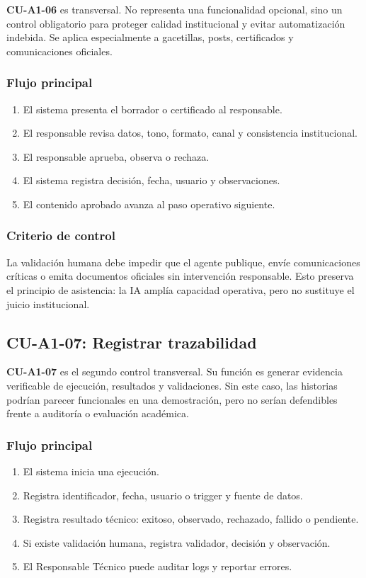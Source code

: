 \documentclass[11pt,a4paper]{article}
\newcommand{\caso}[1]{\textbf{\textcolor{FieBlue}{#1}}}
\begin{document}
\caso{CU-A1-06} es transversal. No representa una funcionalidad opcional, sino un control obligatorio para proteger calidad institucional y evitar automatización indebida. Se aplica especialmente a gacetillas, posts, certificados y comunicaciones oficiales.

\subsubsection{Flujo principal}

\begin{enumerate}
  \item El sistema presenta el borrador o certificado al responsable.
  \item El responsable revisa datos, tono, formato, canal y consistencia institucional.
  \item El responsable aprueba, observa o rechaza.
  \item El sistema registra decisión, fecha, usuario y observaciones.
  \item El contenido aprobado avanza al paso operativo siguiente.
\end{enumerate}

\subsubsection{Criterio de control}

La validación humana debe impedir que el agente publique, envíe comunicaciones críticas o emita documentos oficiales sin intervención responsable. Esto preserva el principio de asistencia: la IA amplía capacidad operativa, pero no sustituye el juicio institucional.

\subsection{CU-A1-07: Registrar trazabilidad}

\caso{CU-A1-07} es el segundo control transversal. Su función es generar evidencia verificable de ejecución, resultados y validaciones. Sin este caso, las historias podrían parecer funcionales en una demostración, pero no serían defendibles frente a auditoría o evaluación académica.

\subsubsection{Flujo principal}

\begin{enumerate}
  \item El sistema inicia una ejecución.
  \item Registra identificador, fecha, usuario o trigger y fuente de datos.
  \item Registra resultado técnico: exitoso, observado, rechazado, fallido o pendiente.
  \item Si existe validación humana, registra validador, decisión y observación.
  \item El Responsable Técnico puede auditar logs y reportar errores.
\end{enumerate}
\end{document}
